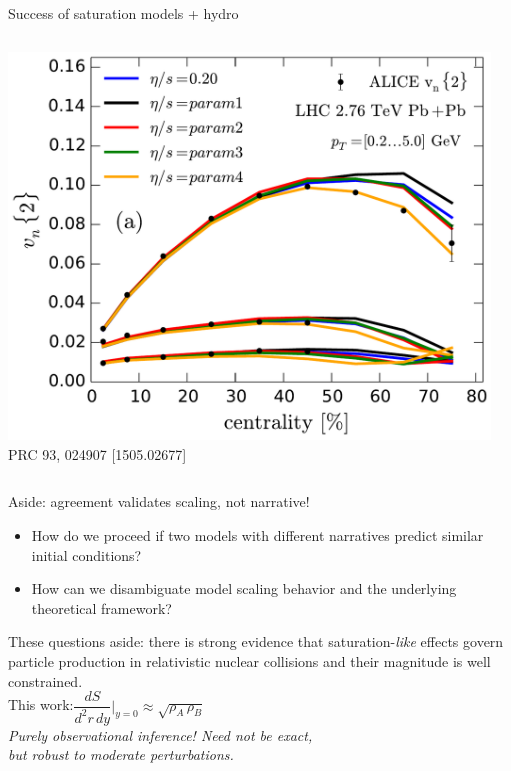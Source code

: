 \documentclass{beamer}
\begin{document}
\begin{frame}[plain]{Success of saturation models + hydro}
\begin{columns}
\begin{column}{.4\textwidth}
      \includegraphics[width=.91\columnwidth]{vn_ekrt} \\
      {\tiny PRC 93, 024907 [1505.02677]}
    \end{column}
    \begin{column}{.075\textwidth}
    \end{column}
  \end{columns}
\end{frame}


\begin{frame}{Aside: agreement validates scaling, not narrative!}
  \begin{itemize}
  \large
  \item[\faicon{question-circle-o}] How do we proceed if two models with different narratives predict similar initial conditions?\\[2ex] 
  \item[\faicon{wrench}] How can we disambiguate model scaling behavior and the underlying theoretical framework?
  \end{itemize}
  \begin{center}
    These questions aside: there is strong evidence that saturation-\emph{like} effects govern particle production in relativistic nuclear collisions and their magnitude is well constrained.\\[2ex]
    This work:\quad $\dfrac{dS}{d^2r\,dy}\Big\vert_{y=0} \approx \sqrt{\rho_A \,\rho_B}$\\[2ex]
    \emph{Purely observational inference! Need not be exact,\\but robust to moderate perturbations.}
  \end{center}
\end{frame}
\end{document}
